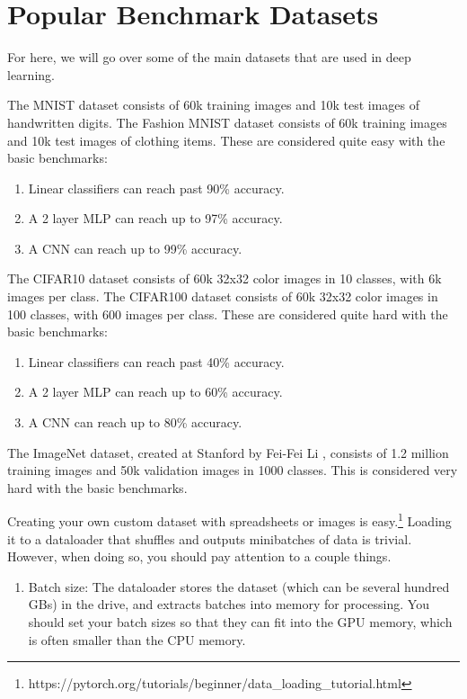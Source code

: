 \section{Popular Benchmark Datasets} 

  For here, we will go over some of the main datasets that are used in deep learning. 

  \begin{definition}
    The MNIST dataset consists of 60k training images and 10k test images of handwritten digits. The Fashion MNIST dataset consists of 60k training images and 10k test images of clothing items. These are considered quite easy with the basic benchmarks: 
    \begin{enumerate} 
      \item Linear classifiers can reach past 90\% accuracy. 
      \item A 2 layer MLP can reach up to 97\% accuracy. 
      \item A CNN can reach up to 99\% accuracy. 
    \end{enumerate}
  \end{definition}

  \begin{definition}
    The CIFAR10 dataset consists of 60k 32x32 color images in 10 classes, with 6k images per class. The CIFAR100 dataset consists of 60k 32x32 color images in 100 classes, with 600 images per class. These are considered quite hard with the basic benchmarks: 
    \begin{enumerate} 
      \item Linear classifiers can reach past 40\% accuracy. 
      \item A 2 layer MLP can reach up to 60\% accuracy. 
      \item A CNN can reach up to 80\% accuracy. 
    \end{enumerate}
  \end{definition}

  \begin{definition}[ImageNet]
    The ImageNet dataset, created at Stanford by Fei-Fei Li \cite{ImageNet}, consists of 1.2 million training images and 50k validation images in 1000 classes. This is considered very hard with the basic benchmarks. 
  \end{definition}

  Creating your own custom dataset with spreadsheets or images is easy.\footnote{https://pytorch.org/tutorials/beginner/data\_loading\_tutorial.html} Loading it to a dataloader that shuffles and outputs minibatches of data is trivial. However, when doing so, you should pay attention to a couple things. 
  \begin{enumerate} 
    \item Batch size: The dataloader stores the dataset (which can be several hundred GBs) in the drive, and extracts batches into memory for processing. You should set your batch sizes so that they can fit into the GPU memory, which is often smaller than the CPU memory. 
  \end{enumerate}

